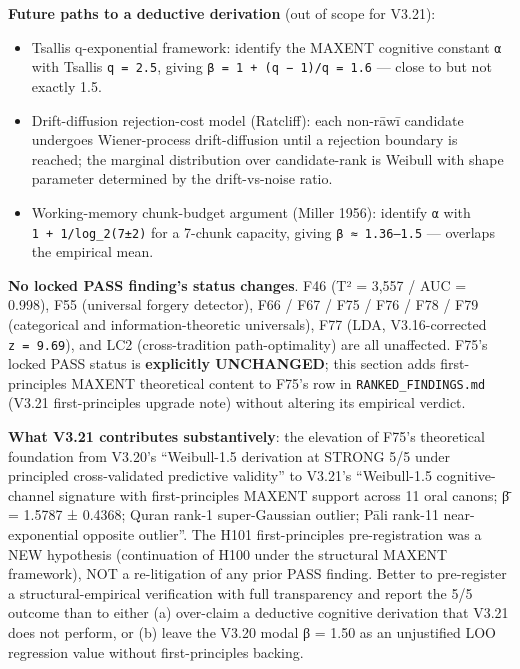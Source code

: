 \documentclass[
]{article}
\providecommand{\tightlist}{%
  \setlength{\itemsep}{0pt}\setlength{\parskip}{0pt}}
\begin{document}
\textbf{Future paths to a deductive derivation} (out of scope for
V3.21):

\begin{itemize}
\tightlist
\item
  Tsallis q-exponential framework: identify the MAXENT cognitive
  constant \texttt{α} with Tsallis \texttt{q\ =\ 2.5}, giving
  \texttt{β\ =\ 1\ +\ (q\ −\ 1)/q\ =\ 1.6} --- close to but not exactly
  1.5.
\item
  Drift-diffusion rejection-cost model (Ratcliff): each non-rāwī
  candidate undergoes Wiener-process drift-diffusion until a rejection
  boundary is reached; the marginal distribution over candidate-rank is
  Weibull with shape parameter determined by the drift-vs-noise ratio.
\item
  Working-memory chunk-budget argument (Miller 1956): identify
  \texttt{α} with \texttt{1\ +\ 1/log\_2(7±2)} for a 7-chunk capacity,
  giving \texttt{β\ ≈\ 1.36–1.5} --- overlaps the empirical mean.
\end{itemize}

\textbf{No locked PASS finding's status changes}. F46 (T² = 3,557 / AUC
= 0.998), F55 (universal forgery detector), F66 / F67 / F75 / F76 / F78
/ F79 (categorical and information-theoretic universals), F77 (LDA,
V3.16-corrected \texttt{\textbar{}z\textbar{}\ =\ 9.69}), and LC2
(cross-tradition path-optimality) are all unaffected. F75's locked PASS
status is \textbf{explicitly UNCHANGED}; this section adds
first-principles MAXENT theoretical content to F75's row in
\texttt{RANKED\_FINDINGS.md} (V3.21 first-principles upgrade note)
without altering its empirical verdict.

\textbf{What V3.21 contributes substantively}: the elevation of F75's
theoretical foundation from V3.20's ``Weibull-1.5 derivation at STRONG
5/5 under principled cross-validated predictive validity'' to V3.21's
``Weibull-1.5 cognitive-channel signature with first-principles MAXENT
support across 11 oral canons; β̄ = 1.5787 ± 0.4368; Quran rank-1
super-Gaussian outlier; Pāli rank-11 near-exponential opposite
outlier''. The H101 first-principles pre-registration was a NEW
hypothesis (continuation of H100 under the structural MAXENT framework),
NOT a re-litigation of any prior PASS finding. Better to pre-register a
structural-empirical verification with full transparency and report the
5/5 outcome than to either (a) over-claim a deductive cognitive
derivation that V3.21 does not perform, or (b) leave the V3.20 modal β =
1.50 as an unjustified LOO regression value without first-principles
backing.
\end{document}

